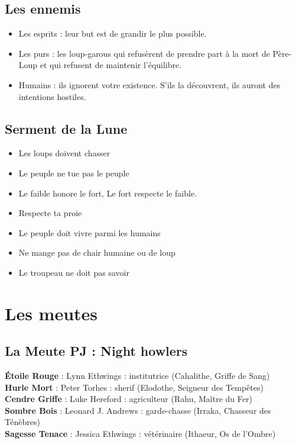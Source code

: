 \documentclass[oneside,12pt]{book}
\newcommand{\Lynn}{\textbf{Étoile Rouge} }
\newcommand{\Jessica}{\textbf{Sagesse Tenace} }
\newcommand{\Luke}{\textbf{Cendre Griffe} }
\newcommand{\Peter}{\textbf{Hurle Mort} }
\newcommand{\Leonard}{\textbf{Sombre Bois} }
\begin{document}
\begin{flushleft}
\subsection{Les ennemis}
\begin{itemize}
\item Les esprits : leur but est de grandir le plus possible.
\item Les purs : les loup-garous qui refusèrent de prendre part à la mort de Père-Loup et qui refusent de maintenir l'équilibre.
\item Humains : ils ignorent votre existence. S’ils la découvrent, ils auront des intentions hostiles.
\end{itemize}


\subsection{Serment de la Lune}
\begin{itemize}
\item Les loups doivent chasser
\item Le peuple ne tue pas le peuple
\item Le faible honore le fort, Le fort respecte le faible.
\item Respecte ta proie
\item Le peuple doit vivre parmi les humains
\item Ne mange pas de chair humaine ou de loup
\item Le troupeau ne doit pas savoir
\end{itemize}

  
\section{Les meutes}
\subsection{La Meute PJ : Night howlers}
\Lynn : Lynn Ethwings :  institutrice (Cahalithe, Griffe de Sang) \\
\Peter : Peter Torhes : sherif (Elodothe, Seigneur des Tempêtes) \\
\Luke : Luke Hereford : agriculteur (Rahu, Maître du Fer)\\
\Leonard : Leonard J. Andrews : garde-chasse (Irraka, Chasseur des Ténèbres)\\
\Jessica : Jessica  Ethwings : vétérinaire (Ithaeur, Os de l'Ombre)\\


\end{flushleft}
\end{document}
